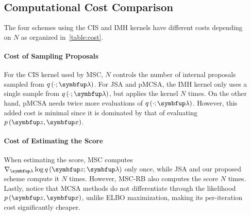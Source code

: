 \begin{wraptable}[11]{r}{0.55\textwidth}
  \vspace{-5ex}
  \centering
  
\end{wraptable}
%
\vspace{-1.5ex}
\subsection{Computational Cost Comparison}
\vspace{-1.5ex}
The four schemes using the CIS and IMH kernels have different costs depending on \(N\) as organized in~\cref{table:cost}.

\vspace{-1.5ex}
\paragraph{Cost of Sampling Proposals}
For the CIS kernel used by MSC, \(N\) controls the number of internal proposals sampled from \(q\,(\cdot; \vlambda)\).
For JSA and pMCSA, the IMH kernel only uses a single sample from \(q\,(\cdot; \vlambda)\), but applies the kernel \(N\) times.
On the other hand, pMCSA needs twice more evaluations of \(q\,(\cdot; \vlambda)\).
However, this added cost is minimal since it is dominated by that of evaluating \(p\,(\vz,\vx)\).

\vspace{-1.5ex}
\paragraph{Cost of Estimating the Score}
When estimating the score, MSC computes \(\nabla_{\vlambda} \log q\,(\vz; \vlambda)\) only once, while JSA and our proposed scheme compute it \(N\) times.
However, MSC-RB also computes the score \(N\) times.
Lastly, notice that MCSA methods do not differentiate through the likelihood \(p\,(\vz,\vx)\), unlike ELBO maximization, making its per-iteration cost significantly cheaper.

